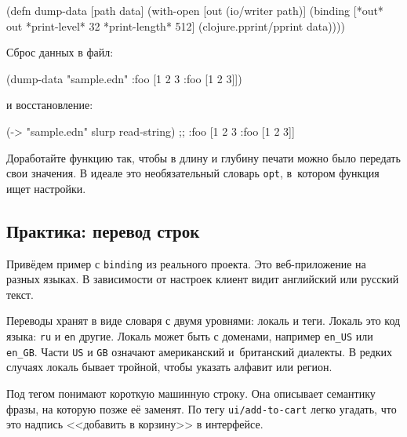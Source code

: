 \begin{english}
  \begin{clojure}
(defn dump-data
  [path data]
  (with-open [out (io/writer path)]
    (binding [*out* out
              *print-level* 32
              *print-length* 512]
      (clojure.pprint/pprint data))))
  \end{clojure}
\end{english}

\noindent
Сброс данных в файл:

\begin{english}
  \begin{clojure}
(dump-data "sample.edn" {:foo [1 2 3 {:foo [1 2 3]}]})
  \end{clojure}
\end{english}

\noindent
и восстановление:

\begin{english}
  \begin{clojure}
(-> "sample.edn" slurp read-string)
;; {:foo [1 2 3 {:foo [1 2 3]}]}
  \end{clojure}
\end{english}


Доработайте функцию так, чтобы в длину и глубину печати можно было передать свои
значения. В идеале это необязательный словарь \verb|opt|, в~котором функция ищет
настройки.

\subsection{Практика: перевод строк}

\label{translate}

Привёдем пример с \verb|binding| из реального проекта. Это веб-приложение на
разных языках. В зависимости от настроек клиент видит английский или русский
текст.


Переводы хранят в виде словаря с двумя уровнями: локаль и теги. Локаль это код
языка: \verb|ru| и \verb|en| другие. Локаль может быть с доменами, например
\verb|en_US| или \verb|en_GB|. Части \verb|US| и \verb|GB| означают
американский и~британский диалекты. В редких случаях локаль бывает тройной,
чтобы указать алфавит или регион.

Под тегом понимают короткую машинную строку. Она описывает семантику фразы, на
которую позже её заменят. По тегу \verb|ui/add-to-cart| легко угадать, что
это надпись <<добавить в корзину>> в интерфейсе.

